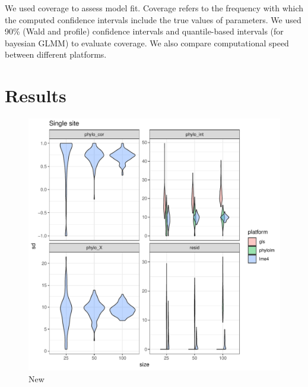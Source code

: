 \documentclass[12pt]{article}
\begin{document}
We used coverage to assess model fit.
Coverage refers to the frequency with which the computed confidence intervals include the true values of
parameters.
We used 90\% (Wald and profile) confidence intervals and quantile-based intervals (for bayesian GLMM)
to evaluate coverage.
We also compare computational speed between different platforms.

\section{Results}

\begin{center}
\begin{figure}[h]
  \includegraphics[scale=0.8,page=1]{./git_push/plot.Rout.pdf}
  \caption{New}
\label{ssplot}
\end{figure}
\end{center}
\end{document}
